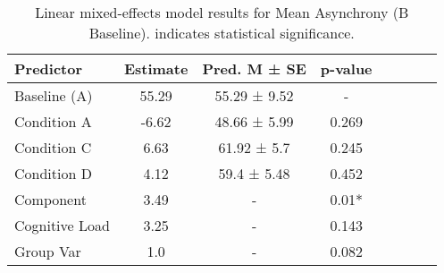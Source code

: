 
    \begin{table}[H]
    \centering
    \begin{small}
    \begin{tabular}{lccccccc}
\toprule
Predictor & Estimate & Pred. M ± SE & p-value \\
\midrule
Baseline (A) & 55.29 & 55.29 ± 9.52 & - \\
Condition A & -6.62 & 48.66 ± 5.99 & 0.269 \\
Condition C & 6.63 & 61.92 ± 5.7 & 0.245 \\
Condition D & 4.12 & 59.4 ± 5.48 & 0.452 \\
Component & 3.49 & - & 0.01* \\
Cognitive Load & 3.25 & - & 0.143 \\
Group Var & 1.0 & - & 0.082 \\
\bottomrule
\end{tabular}

    \end{small}
    \caption[Linear mixed-effects model results for Mean Asynchrony (B Baseline)]{Linear mixed-effects model results for Mean Asynchrony (B Baseline). \newline * indicates statistical significance.}
    \label{tab:meanasynchrony (b baseline)}

    \end{table}